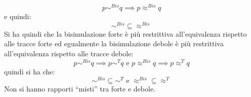 \[p\sim^{Bis} q\implies p\approx^{Bis} q\]
e quindi:
\[\sim^{Bis} \subseteq \approx^{Bis}\]
Si ha quindi che la bisimulazione forte è più restrittiva all’equivalenza
rispetto alle tracce forte ed egualmente la bisimulazione debole è più
restrittiva all’equivalenza rispetto alle tracce debole:
\[p\sim^{Bis}q\implies p\sim^T q\mbox{ e }p\approx^{Bis}q\implies p\approx^Tq\]
quindi si ha che:
\[\sim^{Bis}\subseteq\sim^T \mbox{ e }\approx^{Bis}\subseteq\approx^T\]
Non si hanno rapporti ``misti'' tra forte e debole.\\
\begin{table}[]
\centering
{}
\end{table}
